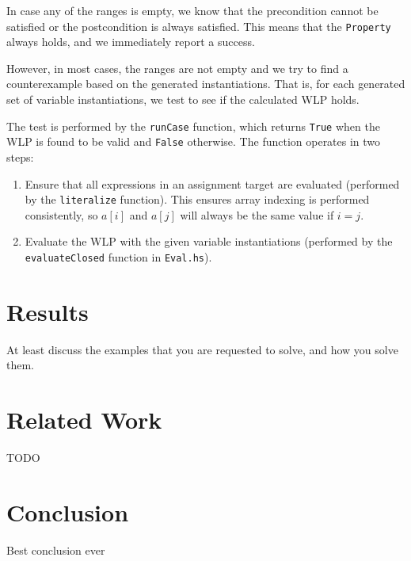 \documentclass[a4paper]{article}
\begin{document}
In case any of the ranges is empty, we know that the precondition cannot be
satisfied or the postcondition is always satisfied. This means that the
\texttt{Property} always holds, and we immediately report a success.

However, in most cases, the ranges are not empty and we try to find a counterexample
based on the generated instantiations. That is, for each generated set of variable
instantiations, we test to see if the calculated WLP holds.

The test is performed by the \texttt{runCase} function, which returns \texttt{True}
when the WLP is found to be valid and \texttt{False} otherwise. The function
operates in two steps:

\begin{enumerate}
\item Ensure that all expressions in an assignment target are evaluated (performed
by the \texttt{literalize} function). This ensures array indexing is performed
consistently, so $a[i]$ and $a[j]$ will always be the same value if $i = j$.
\item Evaluate the WLP with the given variable instantiations (performed by the
\texttt{evaluateClosed} function in \texttt{Eval.hs}).
\end{enumerate}

\section{Results}

At least discuss the examples that you are requested
to solve, and how you solve them.

\section{Related Work}

TODO

\section{Conclusion}

Best conclusion ever



\end{document}
